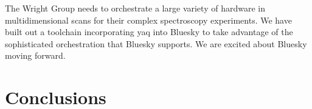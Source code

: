 \documentclass{article}
\begin{document}
The Wright Group needs to orchestrate a large variety of hardware in multidimensional scans for their complex spectroscopy experiments.
We have built out a toolchain incorporating yaq into Bluesky to take advantage of the sophisticated orchestration that Bluesky supports.
We are excited about Bluesky moving forward.

\section{Conclusions}

\clearpage


\end{document}
